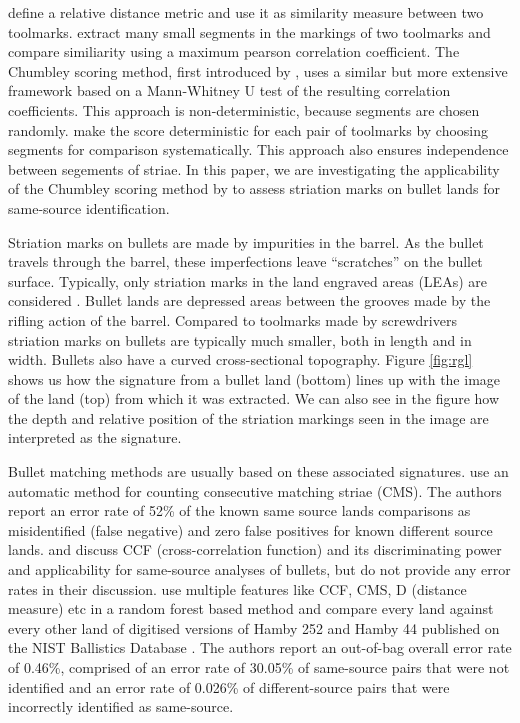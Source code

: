\documentclass[12pt]{article}
\begin{document}
\citet{manytoolmarks2} define a relative distance metric and use it as
similarity measure between two toolmarks. \citet{manytoolmarks1} extract
many small segments in the markings of two toolmarks and compare
similiarity using a maximum pearson correlation coefficient. The
Chumbley scoring method, first introduced by \citet{chumbley}, uses a
similar but more extensive framework based on a Mann-Whitney U test of
the resulting correlation coefficients. This approach is
non-deterministic, because segments are chosen randomly. \citep{hadler}
make the score deterministic for each pair of toolmarks by choosing
segments for comparison systematically. This approach also ensures
independence between segements of striae. In this paper, we are
investigating the applicability of the Chumbley scoring method by
\citet{hadler} to assess striation marks on bullet lands for same-source
identification.

Striation marks on bullets are made by impurities in the barrel. As the
bullet travels through the barrel, these imperfections leave
``scratches'' on the bullet surface. Typically, only striation marks in
the land engraved areas (LEAs) are considered \citet{afte-article1992}.
Bullet lands are depressed areas between the grooves made by the rifling
action of the barrel. Compared to toolmarks made by screwdrivers
striation marks on bullets are typically much smaller, both in length
and in width. Bullets also have a curved cross-sectional topography.
Figure \ref{fig:rgl} shows us how the signature from a bullet land
(bottom) lines up with the image of the land (top) from which it was
extracted. We can also see in the figure how the depth and relative
position of the striation markings seen in the image are interpreted as
the signature.

Bullet matching methods are usually based on these associated
signatures. \citet{chu2013} use an automatic method for counting
consecutive matching striae (CMS). The authors report an error rate of
52\% of the known same source lands comparisons as misidentified (false
negative) and zero false positives for known different source lands.
\citet{ma2004} and \citet{vorburger2011} discuss CCF (cross-correlation
function) and its discriminating power and applicability for same-source
analyses of bullets, but do not provide any error rates in their
discussion. \citet{aoas} use multiple features like CCF, CMS, D
(distance measure) etc in a random forest based method and compare every
land against every other land of digitised versions of Hamby 252 and
Hamby 44 \citep{hamby} published on the NIST Ballistics Database
\citep{nist}. The authors report an out-of-bag overall error rate of
0.46\%, comprised of an error rate of 30.05\% of same-source pairs that
were not identified and an error rate of 0.026\% of different-source
pairs that were incorrectly identified as same-source.
\end{document}
